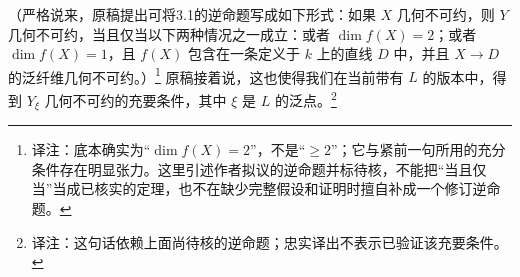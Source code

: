 \documentclass[openany]{ctexbook}
\newcommand{\note}[1]{\footnote{译注：#1}}
\begin{document}
（严格说来，原稿提出可将3.1的逆命题写成如下形式：如果 $X$ 几何不可约，则 $Y$ 几何不可约，当且仅当以下两种情况之一成立：或者 $\dim f(X)=2$；或者 $\dim f(X)=1$，且 $f(X)$ 包含在一条定义于 $k$ 上的直线 $D$ 中，并且 $X\to D$ 的泛纤维几何不可约。）\note{底本确实为“$\dim f(X)=2$”，不是“$\ge2$”；它与紧前一句所用的充分条件存在明显张力。这里引述作者拟议的逆命题并标待核，不能把“当且仅当”当成已核实的定理，也不在缺少完整假设和证明时擅自补成一个修订逆命题。}
原稿接着说，这也使得我们在当前带有 $L$ 的版本中，得到 $Y_\xi$ 几何不可约的充要条件，其中 $\xi$ 是 $L$ 的泛点。\note{这句话依赖上面尚待核的逆命题；忠实译出不表示已验证该充要条件。}
\end{document}
